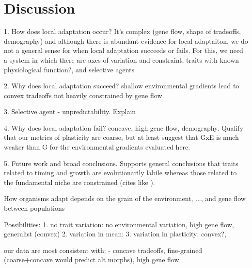 \documentclass[11pt, oneside]{article}\usepackage[]{graphicx}\usepackage[]{color}
\begin{document}

\section*{Discussion}

1. How does local adaptation occur? It's complex (gene flow, shape of tradeoffs, demography) and although there is abundant evidence for local adaptaiton, we do not a general sense for when local adaptation succeeds or fails. For this, we need a system in which there are axes of variation and constraint, traits with known physiological function?, and selective agents

2. Why does local adaptation succeed? shallow environmental gradients lead to convex tradeoffs not heavily constrained by gene flow.

3. Selective agent - unpredictability. Explain

4. Why does local adaptation fail? concave, high gene flow, demography. Qualify that our metrics of plasticity are coarse, but at least suggest that GxE is much weaker than G for the environmental gradients evaluated here.

5. Future work and broad conclusions. Supports general conclusions that traits related to timing and growth are evolutionarily labile whereas those related to the fundamental niche are constrained (cites like \cite{Emery_etal_2012, Emery_Ackerly_2014}).

How organisms adapt depends on the grain of the environment, ..., and gene flow between populations

Possibilities:
1. no trait variation: no environmental variation, high gene flow, generalist (convex)
2. variation in mean:
3. variation in plasticity: convex?,

our data are most consistent with:
- concave tradeoffs, fine-grained (coarse+concave would predict alt morphs), high gene flow


\setlength{\bibsep}{6pt}
\bigskip




\end{document}
